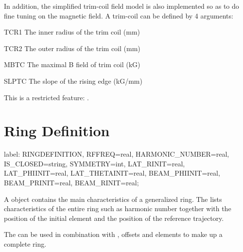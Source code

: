 In addition, the simplified trim-coil field model is also implemented so as to
do fine tuning on the magnetic field. A trim-coil can be defined by 4 arguments:
\begin{kdescription}
\item[TCR1]
   The inner radius of the trim coil (mm)
\item[TCR2]
   The outer radius of the trim coil (mm)
\item[MBTC]
    The maximal B field of trim coil (kG)
\item[SLPTC]
   The slope of the rising edge (kG/mm)
\end{kdescription}
This is a restricted feature: \opalcycl.

\clearpage
\section{Ring Definition}
\label{sec:ringdefinition}

\begin{example}
label: RINGDEFINITION,
       RFFREQ=real, HARMONIC_NUMBER=real, IS_CLOSED=string, SYMMETRY=int,
       LAT_RINIT=real, LAT_PHIINIT=real, LAT_THETAINIT=real,
       BEAM_PHIINIT=real, BEAM_PRINIT=real, BEAM_RINIT=real;
\end{example}

A  object contains the main characteristics of a
generalized ring. The  lists characteristics of the
entire ring such as harmonic number together with the position of the initial
element and the position of the reference trajectory.

The  can be used in combination with ,
offsets and  elements to make up a complete ring.

